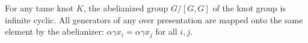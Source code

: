 For any tame knot $K$, the abelianized group $G/[G,G]$ of the knot group is infinite cyclic. All generators of any over presentation are mapped onto the same element by the abelianizer: $\alpha \gamma x_i = \alpha \gamma x_j$ for all $i,j$.
